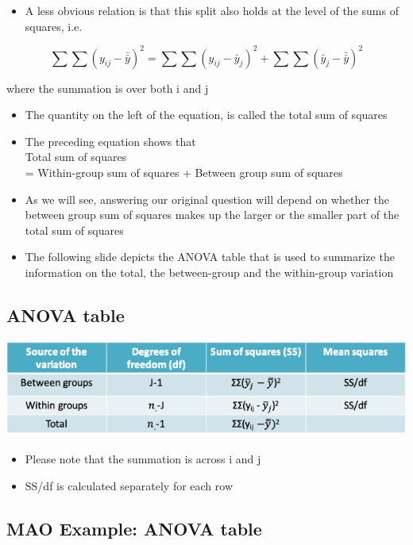 \documentclass[
]{book}
\providecommand{\tightlist}{%
  \setlength{\itemsep}{0pt}\setlength{\parskip}{0pt}}
\begin{document}
\begin{itemize}
\tightlist
\item
  A less obvious relation is that this split also holds at the level of the sums of squares, i.e.
\end{itemize}

\[\sum\sum(y_{ij}-\bar{\bar y})^2=\sum\sum(y_{ij}-\bar y_j)^2+\sum\sum(\bar y_j-\bar{\bar y})^2\]

where the summation is over both i and j

\begin{itemize}
\tightlist
\item
  The quantity on the left of the equation, is called the total sum of squares
\item
  The preceding equation shows that\\
  Total sum of squares\\
  = Within-group sum of squares + Between group sum of squares
\item
  As we will see, answering our original question will depend on whether the between group sum of squares makes up the larger or the smaller part of the total sum of squares
\item
  The following slide depicts the ANOVA table that is used to summarize the information on the total, the between-group and the within-group variation
\end{itemize}

\hypertarget{anova-table}{%
\subsection{ANOVA table}\label{anova-table}}

\includegraphics[width=1\linewidth]{./10_30}

\begin{itemize}
\tightlist
\item
  Please note that the summation is across i and j
\item
  SS/df is calculated separately for each row
\end{itemize}

\hypertarget{mao-example-anova-table}{%
\subsection{MAO Example: ANOVA table}\label{mao-example-anova-table}}
\end{document}

